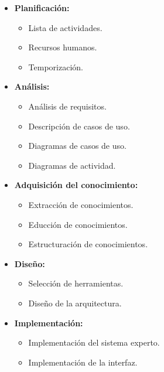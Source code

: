 \bigskip

\begin{itemize}
	\item \textbf{Planificación:}
	\begin{itemize}
		\item Lista de actividades.
		\item Recursos humanos.
		\item Temporización.
	\end{itemize}
\end{itemize}

\bigskip

\begin{itemize}
	\item \textbf{Análisis:}
	\begin{itemize}
		\item Análisis de requisitos.
		\item Descripción de casos de uso.
		\item Diagramas de casos de uso.
		\item Diagramas de actividad.
	\end{itemize}
\end{itemize}

\bigskip

\begin{itemize}
	\item \textbf{Adquisición del conocimiento:}
	\begin{itemize}
		\item Extracción de conocimientos.
		\item Educción de conocimientos.
		\item Estructuración de conocimientos.
	\end{itemize}
\end{itemize}

\bigskip

\begin{itemize}
	\item \textbf{Diseño:}
	\begin{itemize}
		\item Selección de herramientas.
		\item Diseño de la arquitectura.
	\end{itemize}
\end{itemize}

\bigskip

\begin{itemize}
	\item \textbf{Implementación:}
	\begin{itemize}
		\item Implementación del sistema experto.
		\item Implementación de la interfaz.
	\end{itemize}
\end{itemize}


